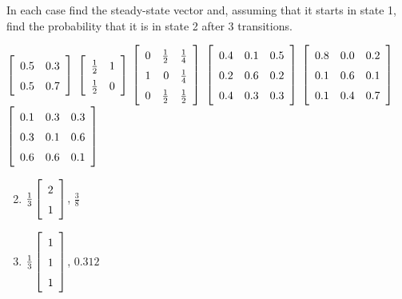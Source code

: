 \begin{multicols}{2}
\begin{ex}
In each case find the steady-state vector and, assuming that it starts in state 1, find the probability that it is in state 2 after $3$ transitions.
\begin{exenumerate}
\exitem $\leftB \begin{array}{cc}
0.5 & 0.3 \\
0.5 & 0.7
\end{array} \rightB$
\exitem $\leftB \def\arraystretch{1.5}\begin{array}{cc}
\frac{1}{2} & 1 \\
\frac{1}{2} & 0
\end{array} \rightB$
\exitem $\leftB \def\arraystretch{1.5}\begin{array}{rrr}
	0 & \frac{1}{2} & \frac{1}{4} \\
	1 & 0 & \frac{1}{4} \\
	0 & \frac{1}{2} & \frac{1}{2}
\end{array} \rightB$
\exitem $\leftB \begin{array}{rrr}
0.4 & 0.1 & 0.5 \\
0.2 & 0.6 & 0.2 \\
0.4 & 0.3 & 0.3
\end{array} \rightB$
\exitem $\leftB \begin{array}{rrr}
0.8 & 0.0 & 0.2 \\
0.1 & 0.6 & 0.1 \\
0.1 & 0.4 & 0.7
\end{array} \rightB$
\exitem $\leftB \begin{array}{rrr}
0.1 & 0.3 & 0.3 \\
0.3 & 0.1 & 0.6 \\
0.6 & 0.6 & 0.1
\end{array} \rightB$
\end{exenumerate}
\begin{sol}
\begin{enumerate}[label={\alph*.}]
\setcounter{enumi}{1}
\item $\frac{1}{3} \leftB \begin{array}{r}
2 \\
1
\end{array} \rightB$, $\frac{3}{8}$

\setcounter{enumi}{3}
\item $\frac{1}{3} \leftB \begin{array}{r}
1 \\
1 \\
1
\end{array} \rightB$, $0.312$


\end{enumerate}
\end{sol}
\end{ex}
\end{multicols}
